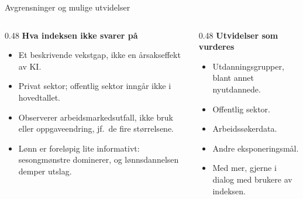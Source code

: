 \begin{frame}{Avgrensninger og mulige utvidelser}
\begin{columns}[T,onlytextwidth]
\begin{column}{0.48\textwidth}
\textbf{\textcolor{illInk}{Hva indeksen ikke svarer på}}

\vspace{0.5em}
\small
\begin{itemize}\setlength{\itemsep}{6pt}
  \item Et beskrivende vekstgap, ikke en årsakseffekt av KI.
  \item Privat sektor; offentlig sektor inngår ikke i hovedtallet.
  \item Observerer arbeidsmarkedsutfall, ikke bruk eller oppgaveendring, jf.\ de fire størrelsene.
  \item Lønn er foreløpig lite informativt: sesongmønstre dominerer, og lønnsdannelsen demper utslag.
\end{itemize}
\end{column}
\begin{column}{0.48\textwidth}
\textbf{\textcolor{illInk}{Utvidelser som vurderes}}

\vspace{0.5em}
\small
\begin{itemize}\setlength{\itemsep}{6pt}
  \item Utdanningsgrupper, blant annet nyutdannede.
  \item Offentlig sektor.
  \item Arbeidssøkerdata.
  \item Andre eksponeringsmål.
  \item Med mer, gjerne i dialog med brukere av indeksen.
\end{itemize}
\end{column}
\end{columns}
\end{frame}

